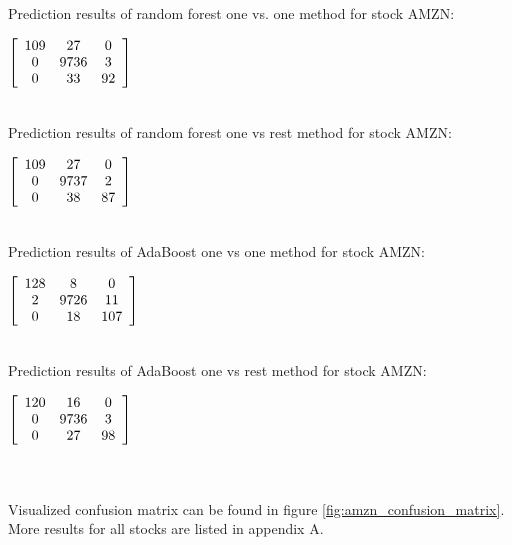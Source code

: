 Prediction results of random forest one vs. one method for stock AMZN:\\
\begin{center}
$\left [{\begin{array}{*{20}c}
109    & 27  & 0 \\
  0  & 9736 & 3 \\
  0 & 33 & 92

 \end{array} } \right]
$ 
\end{center}
\\


Prediction results of random forest one vs rest method for stock AMZN:\\
\begin{center}
$\left [{\begin{array}{*{20}c}
109    & 27  & 0 \\
  0  & 9737 & 2 \\
  0 & 38 & 87

 \end{array} } \right]
$ 
\end{center}
\\

Prediction results of AdaBoost one vs one method for stock AMZN:\\
\begin{center}
$\left [{\begin{array}{*{20}c}
128    & 8  & 0 \\
  2  & 9726 & 11 \\
  0 & 18 & 107

 \end{array} } \right]
$ 
\end{center}
\\

Prediction results of AdaBoost one vs rest method for stock AMZN:\\
\begin{center}
$\left [{\begin{array}{*{20}c}
120    & 16  & 0 \\
  0  & 9736 & 3 \\
  0 & 27 & 98
 \end{array} } \right]
$ 
\end{center}
\\
\\
Visualized confusion matrix can be found in figure \ref{fig:amzn_confusion_matrix}. More results for all stocks are listed in appendix A.

